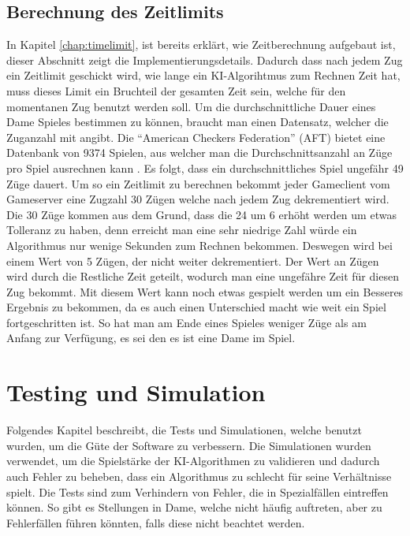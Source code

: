 \documentclass[12pt,a4paper,bibliography=totocnumbered,listof=totocnumbered]{article}
\begin{document}
\subsection{Berechnung des Zeitlimits}
In Kapitel \ref{chap:timelimit}, ist bereits erklärt, wie Zeitberechnung aufgebaut ist, dieser Abschnitt zeigt die Implementierungsdetails.
Dadurch dass nach jedem Zug ein Zeitlimit geschickt wird, wie lange ein KI-Algorihtmus zum Rechnen Zeit hat, muss dieses Limit ein Bruchteil 
der gesamten Zeit sein, welche für den momentanen Zug benutzt werden soll. Um die durchschnittliche Dauer eines Dame Spieles bestimmen zu können,
braucht man einen Datensatz, welcher die Zuganzahl mit angibt. Die ``American Checkers Federation'' (AFT) bietet eine Datenbank von 9374 Spielen,
aus welcher man die Durchschnittsanzahl an Züge pro Spiel ausrechnen kann \cite{CheckersFederation}. Es folgt, dass ein durchschnittliches Spiel 
ungefähr 49 Züge dauert. Um so ein Zeitlimit zu berechnen bekommt jeder Gameclient vom Gameserver eine Zugzahl 30 Zügen welche nach jedem Zug 
dekrementiert wird. Die 30 Züge kommen aus dem Grund, dass die 24 um 6 erhöht werden um etwas Tolleranz zu haben, denn erreicht man 
eine sehr niedrige Zahl würde ein Algorithmus nur wenige Sekunden zum Rechnen bekommen. Deswegen wird bei einem Wert von 5 Zügen, 
der nicht weiter dekrementiert. Der Wert an Zügen wird durch 
die Restliche Zeit geteilt, wodurch man eine ungefähre Zeit für diesen Zug bekommt. Mit diesem Wert kann noch etwas gespielt werden um 
ein Besseres Ergebnis zu bekommen, da es auch einen Unterschied macht wie weit ein Spiel fortgeschritten ist. So hat man am Ende eines Spieles 
weniger Züge als am Anfang zur Verfügung, es sei den es ist eine Dame im Spiel. 

\pagebreak

\section{Testing und Simulation}
Folgendes Kapitel beschreibt, die Tests und Simulationen, welche benutzt wurden, um die Güte der Software zu verbessern. Die Simulationen wurden verwendet, um 
die Spielstärke der KI-Algorithmen zu validieren und dadurch auch Fehler zu beheben, dass ein Algorithmus zu schlecht für seine Verhältnisse spielt.
Die Tests sind zum Verhindern von Fehler, die in Spezialfällen eintreffen können. So gibt es Stellungen in Dame, welche nicht häufig auftreten, 
aber zu Fehlerfällen führen könnten, falls diese nicht beachtet werden.
\end{document}
